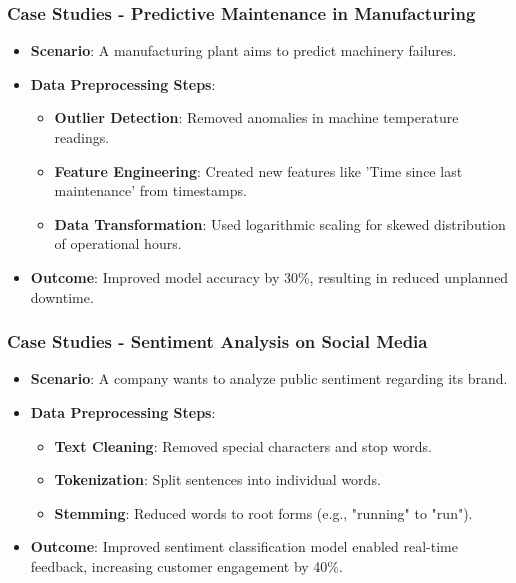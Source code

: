 \documentclass[aspectratio=169]{beamer}
\begin{document}
\begin{frame}[fragile]
    \frametitle{Case Studies - Predictive Maintenance in Manufacturing}
    \begin{itemize}
        \item \textbf{Scenario}: A manufacturing plant aims to predict machinery failures.
        \item \textbf{Data Preprocessing Steps}:
            \begin{itemize}
                \item \textbf{Outlier Detection}: Removed anomalies in machine temperature readings.
                \item \textbf{Feature Engineering}: Created new features like 'Time since last maintenance' from timestamps.
                \item \textbf{Data Transformation}: Used logarithmic scaling for skewed distribution of operational hours.
            \end{itemize}
        \item \textbf{Outcome}: Improved model accuracy by 30\%, resulting in reduced unplanned downtime.
    \end{itemize}
\end{frame}

\begin{frame}[fragile]
    \frametitle{Case Studies - Sentiment Analysis on Social Media}
    \begin{itemize}
        \item \textbf{Scenario}: A company wants to analyze public sentiment regarding its brand.
        \item \textbf{Data Preprocessing Steps}:
            \begin{itemize}
                \item \textbf{Text Cleaning}: Removed special characters and stop words.
                \item \textbf{Tokenization}: Split sentences into individual words.
                \item \textbf{Stemming}: Reduced words to root forms (e.g., "running" to "run").
            \end{itemize}
        \item \textbf{Outcome}: Improved sentiment classification model enabled real-time feedback, increasing customer engagement by 40\%.
    \end{itemize}
\end{frame}
\end{document}
